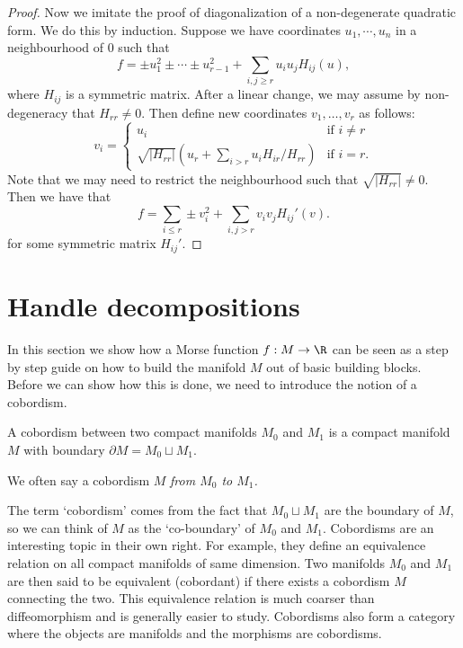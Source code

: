\begin{proof}
    Now we imitate the proof of diagonalization of a non-degenerate quadratic form.
    We do this by induction.
    Suppose we have coordinates $u_1, \cdots, u_n$ in a neighbourhood of $0$ such that
    \[
        f = \pm u_1^2 \pm \cdots \pm u_{r-1}^2 + \sum_{i,j\ge r} u_i u_j H_{ij}(u)
    ,\] 
    where $H_{ij}$ is a symmetric matrix.
    After a linear change, we may assume by non-degeneracy that $H_{rr} \neq 0$.
    Then define new coordinates $ v_1, \ldots, v_r$ as follows:
    \[
        v_i = \begin{cases}
            u_i & \text{if $i \neq r$}\\
            \sqrt{|H_{rr}|} (u_r + \sum_{i > r} u_i H_{ir} / H_{rr}) & \text{if $i = r$.}
        \end{cases}
    \] 
    Note that we may need to restrict the neighbourhood such that $\sqrt{|H_{rr}|} \neq 0$.
    Then we have that
    \[
        f = \sum_{i\le r} \pm v_i^2 + \sum_{i,j > r} v_i v_j H_{ij}'(v)
    .\] 
    for some symmetric matrix $H_{ij}'$.
\end{proof}

\section{Handle decompositions}
In this section we show how a Morse function $f: M \to  \R$ can be seen as a step by step guide on how to build the manifold $M$ out of basic building blocks.
Before we can show how this is done, we need to introduce the notion of a cobordism.


\begin{definition}
A cobordism between two compact manifolds $M_0$ and $M_1$ is a compact manifold $M$  with boundary $\partial M = M_0 \sqcup M_1$.
\end{definition}
\begin{remark}
    We often say a cobordism $M$ \emph{from $M_0$ to $M_1$.}
\end{remark}

The term `cobordism' comes from the fact that $M_0 \sqcup M_1$ are the boundary of $M$, so we can think of $M$ as the `co-boundary' of $M_0$ and $M_1$.
Cobordisms are an interesting topic in their own right.
For example, they define an equivalence relation on all compact manifolds of same dimension. Two manifolds $ M_0$ and $M_1$ are then said to be equivalent (cobordant) if there exists a cobordism $M$ connecting the two.
This equivalence relation is much coarser than diffeomorphism and is generally easier to study.
Cobordisms also form a category where the objects are manifolds and the morphisms are cobordisms.

